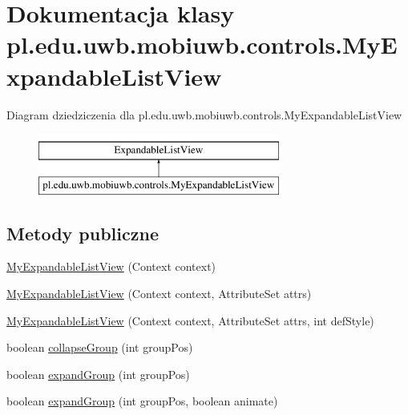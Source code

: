 \hypertarget{classpl_1_1edu_1_1uwb_1_1mobiuwb_1_1controls_1_1_my_expandable_list_view}{}\section{Dokumentacja klasy pl.\+edu.\+uwb.\+mobiuwb.\+controls.\+My\+Expandable\+List\+View}
\label{classpl_1_1edu_1_1uwb_1_1mobiuwb_1_1controls_1_1_my_expandable_list_view}
Diagram dziedziczenia dla pl.\+edu.\+uwb.\+mobiuwb.\+controls.\+My\+Expandable\+List\+View\begin{figure}[H]
\begin{center}
\leavevmode
\includegraphics[height=2.000000cm]{classpl_1_1edu_1_1uwb_1_1mobiuwb_1_1controls_1_1_my_expandable_list_view}
\end{center}
\end{figure}
\subsection*{Metody publiczne}
\begin{DoxyCompactItemize}
\item 
\hyperlink{classpl_1_1edu_1_1uwb_1_1mobiuwb_1_1controls_1_1_my_expandable_list_view_a99458207309dec97b959cd21cb129f97}{My\+Expandable\+List\+View} (Context context)
\item 
\hyperlink{classpl_1_1edu_1_1uwb_1_1mobiuwb_1_1controls_1_1_my_expandable_list_view_aff7235727d3f84a8823d66f60641d5ef}{My\+Expandable\+List\+View} (Context context, Attribute\+Set attrs)
\item 
\hyperlink{classpl_1_1edu_1_1uwb_1_1mobiuwb_1_1controls_1_1_my_expandable_list_view_a32c529873ee7afea349e49ff82c21e12}{My\+Expandable\+List\+View} (Context context, Attribute\+Set attrs, int def\+Style)
\item 
boolean \hyperlink{classpl_1_1edu_1_1uwb_1_1mobiuwb_1_1controls_1_1_my_expandable_list_view_a67a848824e6a2eb1acef3cd7f1a7b33b}{collapse\+Group} (int group\+Pos)
\item 
boolean \hyperlink{classpl_1_1edu_1_1uwb_1_1mobiuwb_1_1controls_1_1_my_expandable_list_view_a4c7a1ccf86711192816c86395cda9997}{expand\+Group} (int group\+Pos)
\item 
boolean \hyperlink{classpl_1_1edu_1_1uwb_1_1mobiuwb_1_1controls_1_1_my_expandable_list_view_a9158e5cead6da8a1355ae86361e30c85}{expand\+Group} (int group\+Pos, boolean animate)
\end{DoxyCompactItemize}


